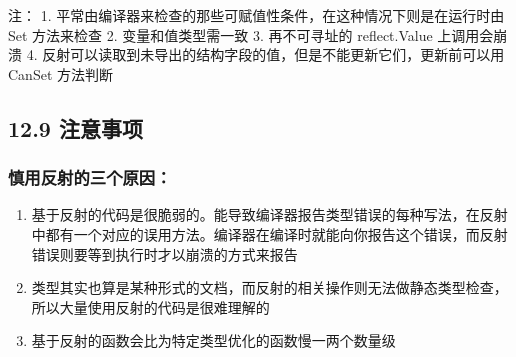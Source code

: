 注： 1.
平常由编译器来检查的那些可赋值性条件，在这种情况下则是在运行时由Set
方法来检查 2. 变量和值类型需一致 3. 再不可寻址的 reflect.Value
上调用会崩溃 4.
反射可以读取到未导出的结构字段的值，但是不能更新它们，更新前可以用
CanSet 方法判断

\hypertarget{ux6ce8ux610fux4e8bux9879}{%
\subsection{12.9 注意事项}\label{ux6ce8ux610fux4e8bux9879}}

\hypertarget{ux614eux7528ux53cdux5c04ux7684ux4e09ux4e2aux539fux56e0}{%
\subsubsection{慎用反射的三个原因：}\label{ux614eux7528ux53cdux5c04ux7684ux4e09ux4e2aux539fux56e0}}

\begin{enumerate}
\def\labelenumi{\arabic{enumi}.}
\tightlist
\item
  基于反射的代码是很脆弱的。能导致编译器报告类型错误的每种写法，在反射中都有一个对应的误用方法。编译器在编译时就能向你报告这个错误，而反射错误则要等到执行时才以崩溃的方式来报告
\item
  类型其实也算是某种形式的文档，而反射的相关操作则无法做静态类型检查，所以大量使用反射的代码是很难理解的
\item
  基于反射的函数会比为特定类型优化的函数慢一两个数量级
\end{enumerate}
